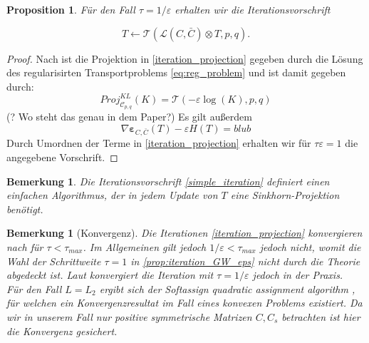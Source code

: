 \documentclass[twoside, 11pt,a4paper]{article}
\newtheorem{proposition}[theorem]{Proposition}
\newtheorem{remark}[theorem]{Bemerkung}
\numberwithin{equation}{section}
\begin{document}
	\begin{proposition} \label{prop:iteration_GW_eps}
		Für den Fall $\tau= 1/\varepsilon$ erhalten wir die Iterationsvorschrift
		
		\begin{equation}
		T \leftarrow \mathcal{T}(\mathcal{L} (C, \bar{C}) \otimes T,p,q). \label{simple_iteration}
		\end{equation}
	\end{proposition}
	\begin{proof}
		Nach \cite{iterative_bregman_projections} ist die Projektion in \ref{iteration_projection} gegeben durch die Lösung des regularisirten Transportproblems \ref{eq:reg_problem} und ist damit gegeben durch:
		\begin{equation}
		Proj_{\mathcal{C}_{p,q}}^{KL}(K) = \mathcal{T}(-\varepsilon \log (K), p, q)
		\end{equation}
		(? Wo steht das genau in dem Paper?)
		Es gilt außerdem
		\begin{equation}
		\nabla \boldsymbol{\varepsilon}_{C, \bar{C}}(T) -\varepsilon H(T) = blub
		\end{equation}
		Durch Umordnen der Terme in \autoref{iteration_projection} erhalten wir für $\tau \varepsilon = 1$ die angegebene Vorschrift.
	\end{proof}
	
	\begin{remark}
		Die Iterationsvorschrift \ref{simple_iteration} definiert einen einfachen Algorithmus, der in jedem Update von $T$ eine Sinkhorn-Projektion benötigt.
	\end{remark}
	
	\begin{remark}[Konvergenz]
		Die Iterationen \autoref{iteration_projection} konvergieren nach \cite{boct2016inertial} für $\tau < \tau_{max}$. Im Allgemeinen gilt jedoch $1/\varepsilon < \tau_{max}$ jedoch nicht, womit die Wahl der Schrittweite $\tau = 1 $ in \autoref{prop:iteration_GW_eps} nicht durch die Theorie abgedeckt ist. Laut \cite{gwd_averaging_kernels} konvergiert die Iteration mit $\tau = 1/\varepsilon$ jedoch in der Praxis.\\
		Für den Fall $L=L_2$ ergibt sich der \glqq \textit{Softassign quadratic assignment algorithm} \glqq{} \cite{rangarajan1999convergence}, für welchen ein Konvergenzresultat im Fall eines konvexen Problems existiert. Da wir in unserem Fall nur positive symmetrische Matrizen $C,C_s$ betrachten ist hier die Konvergenz gesichert.
	\end{remark}
	
\end{document}
